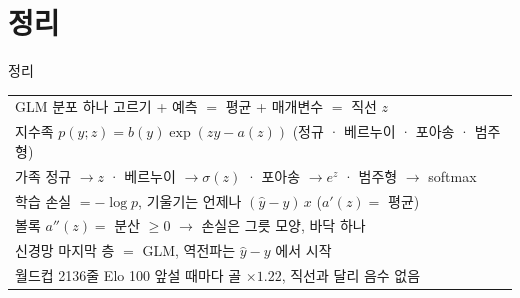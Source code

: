 \documentclass[aspectratio=169,11pt,t]{beamer}
\begin{document}
\section{정리}
\begin{frame}{정리}
\vfill
\centering\large\begin{tabular}{l}
GLM \quad 분포 하나 고르기 + 예측 $=$ 평균 + 매개변수 $=$ 직선 $z$\\[0.5em]
지수족 \quad $p(y;z) = b(y)\exp(z y - a(z))$ \;(정규 · 베르누이 · 포아송 · 범주형)\\[0.5em]
가족 \quad 정규 $\to z$ \;·\; 베르누이 $\to \sigma(z)$ \;·\; 포아송 $\to e^{z}$ \;·\; 범주형 $\to$ softmax\\[0.5em]
학습 \quad 손실 $= -\log p$, 기울기는 언제나 $(\hat y - y)\,x$ \;($a'(z) =$ 평균)\\[0.5em]
볼록 \quad $a''(z) =$ 분산 $\ge 0$ $\to$ 손실은 그릇 모양, 바닥 하나\\[0.5em]
신경망 \quad 마지막 층 $=$ GLM, 역전파는 $\hat y - y$ 에서 시작\\[0.5em]
월드컵 2136줄 \quad Elo 100 앞설 때마다 골 $\times 1.22$, 직선과 달리 음수 없음
\end{tabular}
\vfill
{}
\end{frame}
\end{document}
